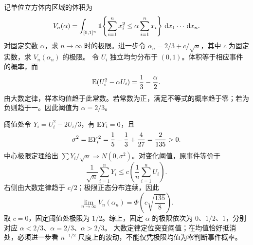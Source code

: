 记单位立方体内区域的体积为
\[
V_n(\alpha)=\int_{[0,1]^n}
\mathbf{1}\!\left\{\sum_{i=1}^n x_i^2\le\alpha\sum_{i=1}^nx_i\right\}
\,\mathrm{d} x_1\cdots\,\mathrm{d} x_n.
\]
对固定实数 $\alpha$，求 $n\to\infty$ 时的极限。进一步令 $\alpha_n=2/3+c/\sqrt n$，其中 $c$ 为固定实数，求 $V_n(\alpha_n)$ 的极限。
\solution 令 $U_i$ 独立均匀分布于 $(0,1)$。体积等于相应事件的概率，而
\[
\mathbb{E}(U_i^2-\alpha U_i)=\frac13-\frac\alpha2.
\]
由大数定律，样本均值趋于此常数。若常数为正，满足不等式的概率趋于零；若为负则趋于一。因此阈值为 $\alpha=2/3$。

阈值处令 $Y_i=U_i^2-2U_i/3$，有 $\mathbb{E} Y_i=0$，且
\[
\sigma^2=\mathbb{E} Y_i^2
=\frac15-\frac13+\frac4{27}=\frac2{135}>0.
\]
中心极限定理给出 $\sum Y_i/\sqrt n\Rightarrow N(0,\sigma^2)$。对变化阈值，原事件等价于
\[
\frac1{\sqrt n}\sum_{i=1}^nY_i
\le c\left(\frac1n\sum_{i=1}^nU_i\right).
\]
右侧由大数定律趋于 $c/2$；极限正态分布连续，因此
\[
\boxed{\lim_{n\to\infty}V_n(\alpha_n)
=\Phi\!\left(c\sqrt{\frac{135}{8}}\right).}
\]
取 $c=0$，固定阈值处极限为 $1/2$。综上，固定 $\alpha$ 的极限依次为 $0$、$1/2$、$1$，分别对应 $\alpha<2/3$、$\alpha=2/3$、$\alpha>2/3$。
\insight 大数定律定位突变阈值；在均值恰好抵消处，必须进一步看 $n^{-1/2}$ 尺度上的波动，不能仅凭极限均值为零判断事件概率。
